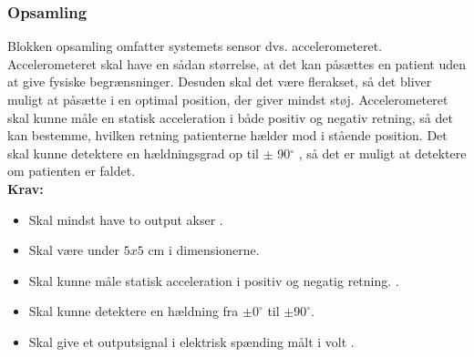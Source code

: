 
\subsubsection{Opsamling}
Blokken opsamling omfatter systemets sensor dvs. accelerometeret. Accelerometeret skal have en sådan størrelse, at det kan påsættes en patient uden at give fysiske begrænsninger. Desuden skal det være flerakset, så det bliver muligt at påsætte i en optimal position, der giver mindst støj. Accelerometeret skal kunne måle en statisk acceleration i både positiv og negativ retning, så det kan bestemme, hvilken retning patienterne hælder mod i stående position.  %
Det skal kunne detektere en hældningsgrad op til $\pm$ 90$^{\circ}$ , så det er muligt at detektere om patienten er faldet. \\
\textbf{Krav:}
\begin{itemize}
\item Skal mindst have to output akser .
\item Skal være under $5x5$ cm i dimensionerne.
\item Skal kunne måle statisk acceleration i positiv og negatig retning. .
\item Skal kunne detektere en hældning fra $\pm 0^{\circ}$ til $\pm 90^{\circ}$.
\item Skal give et outputsignal i elektrisk spænding målt i volt .
\end{itemize}
